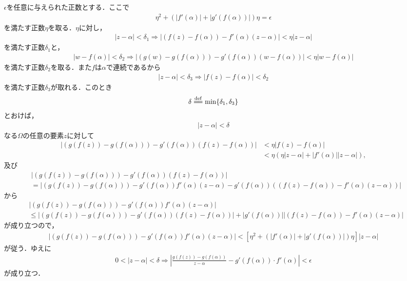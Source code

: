 	\begin{sketch}
		$\epsilon$を任意に与えられた正数とする．ここで
		\begin{align}
			\eta^2 + \left(|f'(\alpha)| + |g'(f(\alpha))| \right) \eta = \epsilon
		\end{align}
		を満たす正数$\eta$を取る．$\eta$に対し，
		\begin{align}
			|z-\alpha| < \delta_1 \Longrightarrow
			\left| (f(z) - f(\alpha)) - f'(\alpha)(z-\alpha) \right| < \eta |z-\alpha|
		\end{align}
		を満たす正数$\delta_1$と，
		\begin{align}
			|w-f(\alpha)| < \delta_2 \Longrightarrow
			\left| (g(w) - g(f(\alpha))) - g'(f(\alpha))(w-f(\alpha)) \right| < \eta |w-f(\alpha)|
		\end{align}
		を満たす正数$\delta_2$を取る．また$f$は$\alpha$で連続であるから
		\begin{align}
			|z-\alpha| < \delta_3 \Longrightarrow \left| f(z) - f(\alpha) \right| < \delta_2
		\end{align}
		を満たす正数$\delta_3$が取れる．このとき
		\begin{align}
			\delta \defeq \operatorname{min}\{\delta_1, \delta_3\}
		\end{align}
		とおけば，
		\begin{align}
			|z-\alpha| < \delta
		\end{align}
		なる$\Omega$の任意の要素$z$に対して
		\begin{align}
			\left| \left(g(f(z)) - g(f(\alpha))\right) - g'(f(\alpha))(f(z)-f(\alpha)) \right| 
			&< \eta |f(z)-f(\alpha)| \\
			&< \eta \left( \eta|z-\alpha| + |f'(\alpha)||z-\alpha| \right),
		\end{align}
		及び
		\begin{align}
			&\left| \left(g(f(z)) - g(f(\alpha))\right) - g'(f(\alpha))(f(z)-f(\alpha)) \right| \\
			&= \left| \left(g(f(z)) - g(f(\alpha))\right) - g'(f(\alpha))f'(\alpha)(z-\alpha)
			- g'(f(\alpha)) \left( (f(z) - f(\alpha)) - f'(\alpha)(z-\alpha) \right) \right|
		\end{align}
		から
		\begin{align}
			&\left| \left(g(f(z)) - g(f(\alpha))\right) - g'(f(\alpha))f'(\alpha)(z-\alpha) \right| \\
			&\leq \left| \left(g(f(z)) - g(f(\alpha))\right) - g'(f(\alpha))(f(z)-f(\alpha)) \right|
			+ \left| g'(f(\alpha)) \right| \left| (f(z) - f(\alpha)) - f'(\alpha)(z-\alpha) \right|
		\end{align}
		が成り立つので，
		\begin{align}
			\left| \left(g(f(z)) - g(f(\alpha))\right) - g'(f(\alpha))f'(\alpha)(z-\alpha) \right|
			< \left[ \eta^2 + \left(|f'(\alpha)| + |g'(f(\alpha))| \right) \eta \right] |z-\alpha|
		\end{align}
		が従う．ゆえに
		\begin{align}
			0 < |z-\alpha| < \delta
			\Longrightarrow \left| \frac{g(f(z)) - g(f(\alpha))}{z-\alpha} - g'(f(\alpha)) \cdot f'(\alpha) \right| < \epsilon
		\end{align}
		が成り立つ．
		\QED
	\end{sketch}
	
